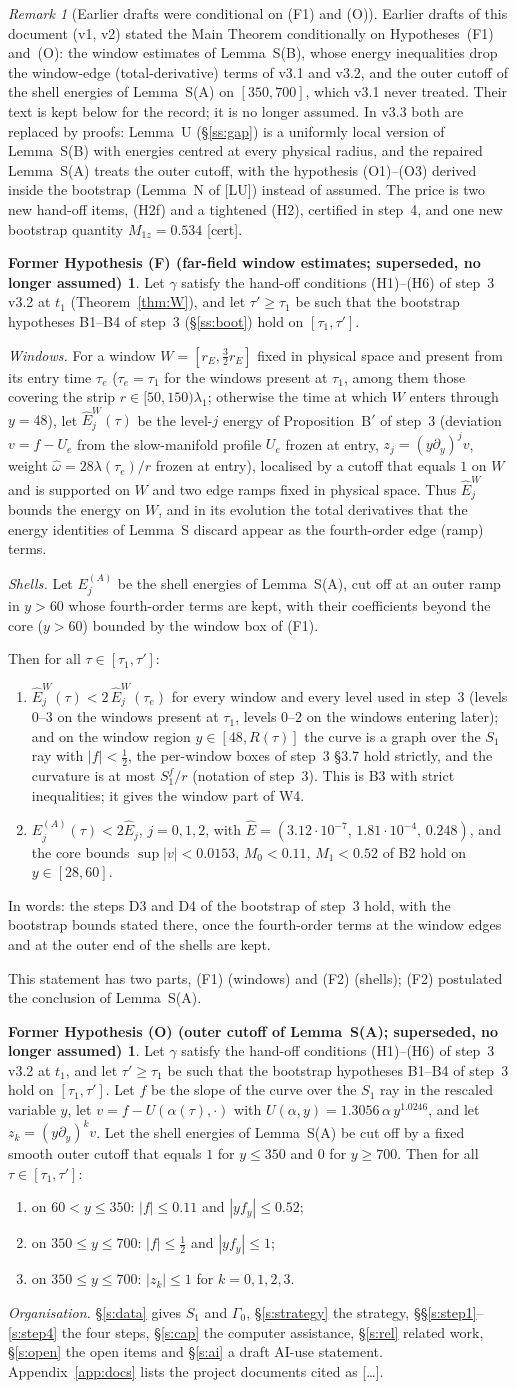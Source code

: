 \documentclass[11pt]{amsart}
\theoremstyle{definition}
\newtheorem*{hypF}{Former Hypothesis (F) (far-field window estimates; superseded, no longer assumed)}
\newtheorem*{hypO}{Former Hypothesis (O) (outer cutoff of Lemma~S(A); superseded, no longer assumed)}
\theoremstyle{remark}
\newtheorem{remark}[theorem]{Remark}
\newcommand{\dref}[1]{[\textsf{#1}]}
\newcommand{\GAPSTATEMENT}{%
Let $\gamma$ satisfy the hand-off conditions \textup{(H1)--(H6)} of step~3 \textup{v3.2} at $t_1$ \textup{(Theorem~\ref{thm:W})}, and let $\tau'\ge\tau_1$ be such that the bootstrap hypotheses \textup{B1--B4} of step~3 \textup{(\S\ref{ss:boot})} hold on $[\tau_1,\tau']$.

\emph{Windows.} For a window $W=[r_E,\frac32r_E]$ fixed in physical space and present from its entry time $\tau_e$ \textup{(}$\tau_e=\tau_1$ for the windows present at $\tau_1$, among them those covering the strip $r\in[50,150)\lambda_1$; otherwise the time at which $W$ enters through $y=48$\textup{)}, let $\hat E^W_j(\tau)$ be the level-$j$ energy of Proposition~B$'$ of step~3 \textup{(}deviation $v=f-U_e$ from the slow-manifold profile $U_e$ frozen at entry, $z_j=(y\partial_y)^jv$, weight $\hat\omega=28\lambda(\tau_e)/r$ frozen at entry\textup{)}, localised by a cutoff that equals $1$ on $W$ and is supported on $W$ and two edge ramps fixed in physical space. Thus $\hat E^W_j$ bounds the energy on $W$, and in its evolution the total derivatives that the energy identities of Lemma~S discard appear as the fourth-order edge \textup{(}ramp\textup{)} terms.

\emph{Shells.} Let $E^{(A)}_j$ be the shell energies of Lemma~S\textup{(A)}, cut off at an outer ramp in $y>60$ whose fourth-order terms are kept, with their coefficients beyond the core \textup{(}$y>60$\textup{)} bounded by the window box of \textup{(F1)}.

Then for all $\tau\in[\tau_1,\tau']$:
\begin{enumerate}[label=\textup{(F\arabic*)},leftmargin=2.6em,itemsep=1pt]
\item $\hat E^W_j(\tau)<2\,\hat E^W_j(\tau_e)$ for every window and every level used in step~3 \textup{(}levels $0$--$3$ on the windows present at $\tau_1$, levels $0$--$2$ on the windows entering later\textup{)}; and on the window region $y\in[48,R(\tau)]$ the curve is a graph over the $S_1$ ray with $|f|<\frac12$, the per-window boxes of step~3 \textup{\S3.7} hold strictly, and the curvature is at most $S^f_1/r$ \textup{(}notation of step~3\textup{)}. This is \textup{B3} with strict inequalities; it gives the window part of \textup{W4}.
\item $E^{(A)}_j(\tau)<2\hat E_j$, $j=0,1,2$, with $\hat E=(3.12\cdot10^{-7},\,1.81\cdot10^{-4},\,0.248)$, and the core bounds $\sup|v|<0.0153$, $M_0<0.11$, $M_1<0.52$ of \textup{B2} hold on $y\in[28,60]$.
\end{enumerate}
In words: the steps \textup{D3} and \textup{D4} of the bootstrap of step~3 hold, with the bootstrap bounds stated there, once the fourth-order terms at the window edges and at the outer end of the shells are kept.}
\begin{document}
\begin{remark}[Earlier drafts were conditional on (F1) and (O)]\label{rem:hist}
Earlier drafts of this document (v1, v2) stated the Main Theorem conditionally on Hypotheses~(F1) and~(O): the window estimates of Lemma~S(B), whose energy inequalities drop the window-edge (total-derivative) terms of v3.1 and v3.2, and the outer cutoff of the shell energies of Lemma~S(A) on $[350,700]$, which v3.1 never treated. Their text is kept below for the record; it is no longer assumed. In v3.3 both are replaced by proofs: Lemma~U (\S\ref{ss:gap}) is a uniformly local version of Lemma~S(B) with energies centred at every physical radius, and the repaired Lemma~S(A) treats the outer cutoff, with the hypothesis (O1)--(O3) derived inside the bootstrap (Lemma~N of \dref{LU}) instead of assumed. The price is two new hand-off items, (H2f) and a tightened (H2), certified in step~4, and one new bootstrap quantity $M_{1z}=0.534$ \textup{[cert]}.
\begin{hypF}
\GAPSTATEMENT
\end{hypF}
This statement has two parts, \textup{(F1)} (windows) and \textup{(F2)} (shells); (F2) postulated the conclusion of Lemma~S(A).
\begin{hypO}
Let $\gamma$ satisfy the hand-off conditions \textup{(H1)--(H6)} of step~3 \textup{v3.2} at $t_1$, and let $\tau'\ge\tau_1$ be such that the bootstrap hypotheses \textup{B1--B4} of step~3 hold on $[\tau_1,\tau']$. Let $f$ be the slope of the curve over the $S_1$ ray in the rescaled variable $y$, let $v=f-U(\alpha(\tau),\cdot)$ with $U(\alpha,y)=1.3056\,\alpha\,y^{1.0246}$, and let $z_k=(y\partial_y)^kv$. Let the shell energies of Lemma~S\textup{(A)} be cut off by a fixed smooth outer cutoff that equals $1$ for $y\le350$ and $0$ for $y\ge700$. Then for all $\tau\in[\tau_1,\tau']$:
\begin{enumerate}[label=\textup{(O\arabic*)},leftmargin=2.6em,itemsep=1pt]
\item on $60<y\le350$: $|f|\le0.11$ and $|yf_y|\le0.52$;
\item on $350\le y\le700$: $|f|\le\frac12$ and $|yf_y|\le1$;
\item on $350\le y\le700$: $|z_k|\le1$ for $k=0,1,2,3$.
\end{enumerate}
\end{hypO}
\end{remark}

\noindent\emph{Organisation.} \S\ref{s:data} gives $S_1$ and $\Gamma_0$, \S\ref{s:strategy} the strategy, \S\S\ref{s:step1}--\ref{s:step4} the four steps, \S\ref{s:cap} the computer assistance, \S\ref{s:rel} related work, \S\ref{s:open} the open items and \S\ref{s:ai} a draft AI-use statement. Appendix~\ref{app:docs} lists the project documents cited as \dref{\dots}.
\end{document}
